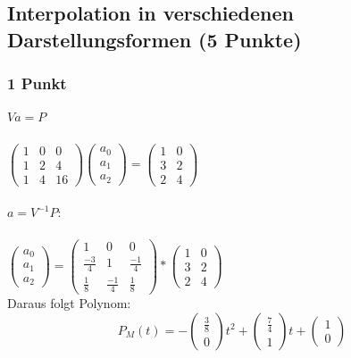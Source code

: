 \newif\ifvimbug
\vimbugfalse

\ifvimbug

\fi


\subsection{Interpolation in verschiedenen Darstellungsformen (5 Punkte)}
\subsubsection{1 Punkt}
$Va = P$\\
\\
$\begin{pmatrix}
1 & 0 & 0 \\ 
1 & 2 & 4 \\ 
1 & 4 & 16
\end{pmatrix} \begin{pmatrix}
a_{0} \\ 
a_{1} \\ 
a_{2}
\end{pmatrix} = \begin{pmatrix}
1&0 \\ 
3&2 \\ 
2&4
\end{pmatrix} $\\
\\
$a =V^{-1} P$:\\
\\
$ \begin{pmatrix}
a_{0} \\ 
a_{1} \\ 
a_{2}
\end{pmatrix} = \begin{pmatrix}
1 &0 & 0 \\ 
\frac{-3}{4} & 1 & \frac{-1}{4} \\ 
\frac{1}{8} & \frac{-1}{4} & \frac{1}{8}
\end{pmatrix} *\begin{pmatrix}
1&0 \\ 
3&2 \\ 
2&4
\end{pmatrix} $\\
Daraus folgt Polynom:\\
$$P_{M}(t) = - \begin{pmatrix}\frac{3}{8}\\0\end{pmatrix}t^{2} + \begin{pmatrix}\frac{7}{4}\\1\end{pmatrix}t + \begin{pmatrix}1\\0\end{pmatrix}$$

